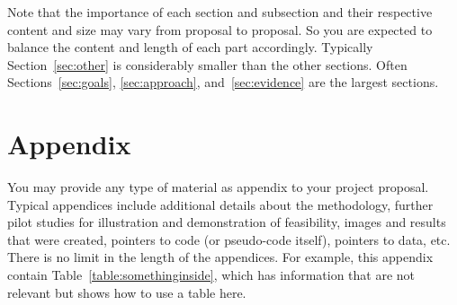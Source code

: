 \documentclass{article}
\begin{document}
Note that the importance of each section and subsection and their respective content and size may vary from proposal to proposal. So you are expected to balance the content and length of each part accordingly. Typically Section~\ref{sec:other} is considerably smaller than the other sections. Often Sections~\ref{sec:goals}, \ref{sec:approach}, and~\ref{sec:evidence} are the largest sections.




\appendix
\section{Appendix}

You may provide any type of material as appendix to your project proposal. Typical appendices include additional details about the methodology, further pilot studies for illustration and demonstration of feasibility, images and results that were created, pointers to code (or pseudo-code itself), pointers to data, etc. There is no limit in the length of the appendices. For example, this appendix contain Table~\ref{table:somethinginside}, which has information that are not relevant but shows how to use a table here.
\end{document}
